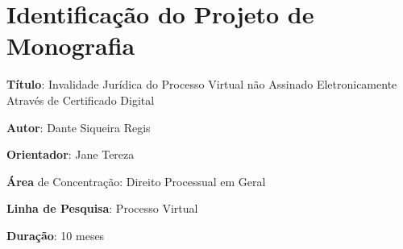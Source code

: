 \chapter{Identificação do Projeto de Monografia}

\textbf{Título}: Invalidade Jurídica do Processo Virtual não Assinado Eletronicamente Através de Certificado Digital\par
\textbf{Autor}: Dante Siqueira Regis\par
\textbf{Orientador}: Jane Tereza\par
\textbf{Área }de Concentração: Direito Processual em Geral\par
\textbf{Linha de Pesquisa}: Processo Virtual\par
\textbf{Duração}: 10 meses
